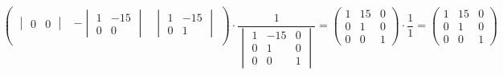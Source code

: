 \documentclass[12pt]{article}
\begin{document}
\begin{sloppypar}
\[\begin{pmatrix}
\begin{vmatrix}
                0 & 0
            \end{vmatrix}
             &
            -\begin{vmatrix}
                 1 & -15 \\
                 0 & 0
             \end{vmatrix}
             &
            \begin{vmatrix}
                1 & -15 \\
                0 & 1
            \end{vmatrix}
            \\
        \end{pmatrix}
        \cdot
        \dfrac{1}{\begin{vmatrix}
                1 & -15 & 0 \\
                0 & 1   & 0 \\
                0 & 0   & 1
            \end{vmatrix}}
        =
        \begin{pmatrix}
            1 & 15 & 0 \\
            0 & 1  & 0 \\
            0 & 0  & 1
        \end{pmatrix}
        \cdot
        \dfrac{1}{1}
        =
        \begin{pmatrix}
            1 & 15 & 0 \\
            0 & 1  & 0 \\
            0 & 0  & 1
        \end{pmatrix}
    \]

\end{sloppypar}
\end{document}
